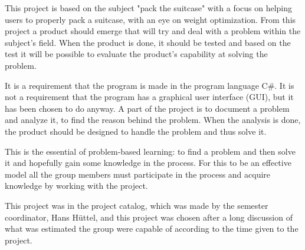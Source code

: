 This project is based on the subject "pack the suitcase" with a focus on helping users to properly pack a suitcase, with an eye on weight optimization. From this project a product should emerge that will try and deal with a problem within the subject's field. When the product is done, it should be tested and based on the test it will be possible to evaluate the product's capability at solving the problem.

It is a requirement that the program is made in the program language C\#. It is not a requirement that the program has a graphical user interface (GUI), but it has been chosen to do anyway.
A part of the project is to document a problem and analyze it, to find the reason behind the problem. When the analysis is done, the product should be designed to handle the problem and thus solve it.

This is the essential of problem-based learning: to find a problem and then solve it and hopefully gain some knowledge in the process.
For this to be an effective model all the group members must participate in the process and acquire knowledge by working with the project.

This project was in the project catalog, which was made by the semester coordinator, Hans Hüttel, and this project was chosen after a long discussion of what was estimated the group were capable of according to the time given to the project.